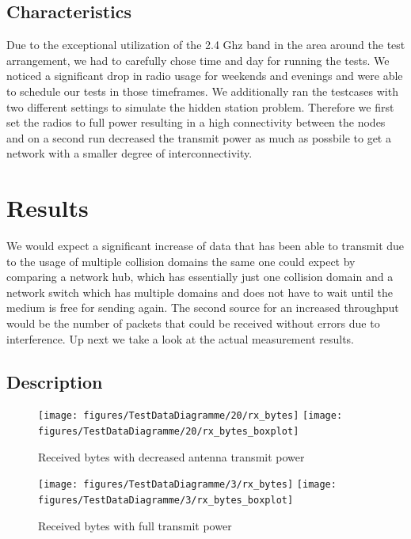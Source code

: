     \subsection{Characteristics}
    Due to the exceptional utilization of the 2.4 Ghz band in the area around the test arrangement, we had to carefully chose time and day
    for running the tests. We noticed a significant drop in radio usage for weekends and evenings and were able to schedule our tests in those timeframes.
    We additionally ran the testcases with two different settings to simulate the hidden station problem. Therefore we first set the radios to full power 
    resulting in a high connectivity between the nodes and on a second run decreased the transmit power as much as possbile to get a network with a smaller degree
    of interconnectivity.
    
\section{Results}
  We would expect a significant increase of data that has been able to transmit due to the usage of multiple collision domains the same one could
  expect by comparing a network hub, which has essentially just one collision domain and a network switch which has multiple domains and does not have
  to wait until the medium is free for sending again. The second source for an increased throughput would be the number of packets that could be received
  without errors due to interference. Up next we take a look at the actual measurement results.
    
  \subsection{Description}
    \begin{figure}[h!]
      \centerline{
	\texttt{[image: figures/TestDataDiagramme/20/rx\_bytes]}%
	\texttt{[image: figures/TestDataDiagramme/20/rx\_bytes\_boxplot]}%
      }
      \caption{Received bytes with decreased antenna transmit power}
      \label{fig:rx20_bytes}
    \end{figure}
    
    \begin{figure}[h!]
      \centerline{
	\texttt{[image: figures/TestDataDiagramme/3/rx\_bytes]}%
	\texttt{[image: figures/TestDataDiagramme/3/rx\_bytes\_boxplot]}%
      }
      \caption{Received bytes with full transmit power}
      \label{fig:rx3_bytes}
    \end{figure}
    
